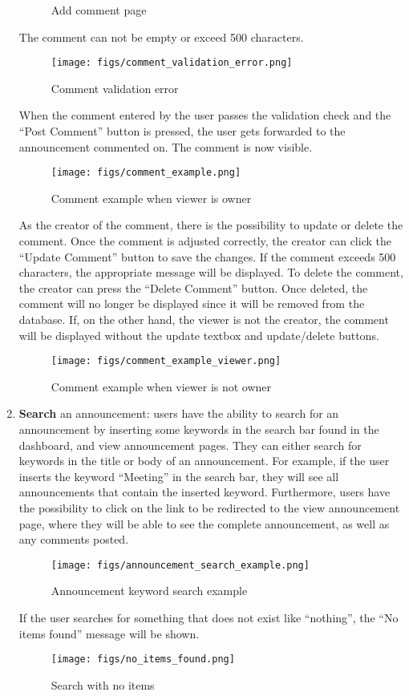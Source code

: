 \documentclass[conference]{IEEEtran}
\begin{document}
\begin{enumerate}
\begin{figure}[H]
    \caption{Add comment page}
    \label{fig:Add comment page}
    \end{figure}
    The comment can not be empty or exceed 500 characters.
    \begin{figure}[H]
    \centering
    \texttt{[image: figs/comment\_validation\_error.png]}
    \caption{Comment validation error}
    \label{fig:Comment validation error}
    \end{figure}
    When the comment entered by the user passes the validation check and the “Post Comment” button is pressed, the user gets forwarded to the announcement commented on. The comment is now visible.
    \begin{figure}[H]
    \centering
    \texttt{[image: figs/comment\_example.png]}
    \caption{Comment example when viewer is owner}
    \label{fig:Comment example}
    \end{figure}
    As the creator of the comment, there is the possibility to update or delete the comment. Once the comment is adjusted correctly, the creator can click the “Update Comment” button to save the changes. If the comment exceeds 500 characters, the appropriate message will be displayed. To delete the comment, the creator can press the “Delete Comment” button. Once deleted, the comment will no longer be displayed since it will be removed from the database. If, on the other hand, the viewer is not the creator, the comment will be displayed without the update textbox and update/delete buttons.
    \begin{figure}[H]
    \centering
    \texttt{[image: figs/comment\_example\_viewer.png]}
    \caption{Comment example when viewer is not owner}
    \label{fig:Comment example}
    \end{figure}
    \item \textbf{Search} an announcement: users have the ability to search for an announcement by inserting some keywords in the search bar found in the dashboard, and view announcement pages. They can either search for keywords in the title or body of an announcement. For example, if the user inserts the keyword “Meeting” in the search bar, they will see all announcements that contain the inserted keyword. Furthermore, users have the possibility to click on the link to be redirected to the view announcement page, where they will be able to see the complete announcement, as well as any comments posted.
    \begin{figure}[H]
    \centering
    \texttt{[image: figs/announcement\_search\_example.png]}
    \caption{Announcement keyword search example}
    \label{fig:Announcement keyword search example}
    \end{figure}
    If the user searches for something that does not exist like “nothing”, the “No items found” message will be shown.
    \begin{figure}[H]
    \centering
    \texttt{[image: figs/no\_items\_found.png]}
    \caption{Search with no items}
    \label{fig:Search with no items}
    \end{figure}
\end{enumerate}
\end{document}
